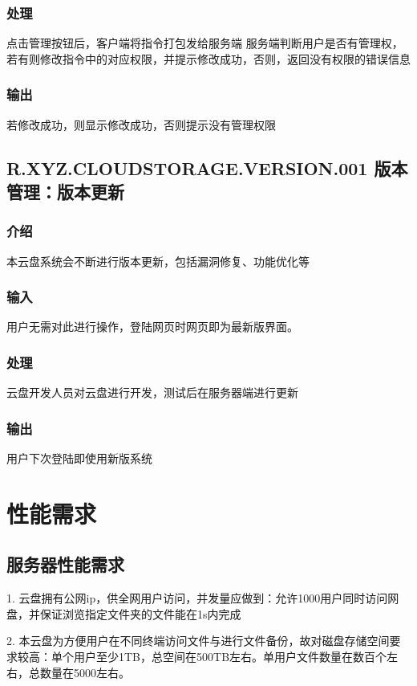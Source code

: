 \subsubsection{处理} 
点击管理按钮后，客户端将指令打包发给服务端
服务端判断用户是否有管理权，若有则修改指令中的对应权限，并提示修改成功，否则，返回没有权限的错误信息

\subsubsection{输出} 
若修改成功，则显示修改成功，否则提示没有管理权限

\subsection{R.XYZ.CLOUDSTORAGE.VERSION.001 版本管理：版本更新}

\subsubsection{介绍}
本云盘系统会不断进行版本更新，包括漏洞修复、功能优化等
\subsubsection{输入} 
用户无需对此进行操作，登陆网页时网页即为最新版界面。

\subsubsection{处理} 
云盘开发人员对云盘进行开发，测试后在服务器端进行更新

\subsubsection{输出} 
用户下次登陆即使用新版系统


\section{性能需求}

\subsection{服务器性能需求}
 
1. 云盘拥有公网ip，供全网用户访问，并发量应做到：允许1000用户同时访问网盘，并保证浏览指定文件夹的文件能在1s内完成

2. 本云盘为方便用户在不同终端访问文件与进行文件备份，故对磁盘存储空间要求较高：单个用户至少1TB，总空间在500TB左右。单用户文件数量在数百个左右，总数量在5000左右。

